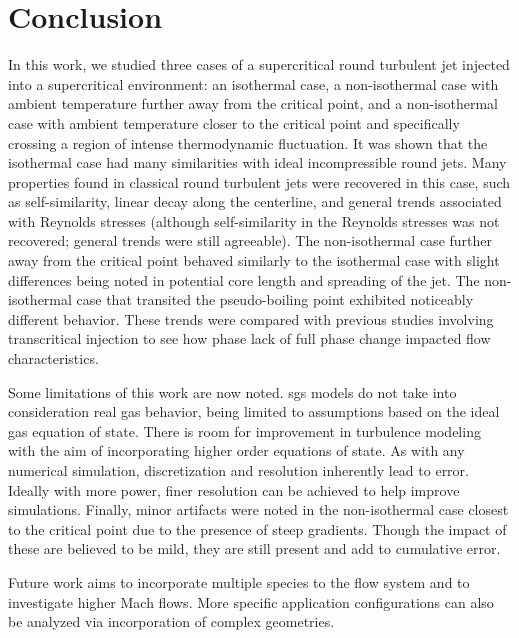 \chapter{Conclusion}

In this work, we studied three cases of a supercritical round turbulent jet injected into a supercritical environment: an isothermal case, a non-isothermal case with ambient temperature further away from the critical point, and a non-isothermal case with ambient temperature closer to the critical point and specifically crossing a region of intense thermodynamic fluctuation. It was shown that the isothermal case had many similarities with ideal incompressible round jets. Many properties found in classical round turbulent jets were recovered in this case, such as self-similarity, linear decay along the centerline, and general trends associated with Reynolds stresses (although self-similarity in the Reynolds stresses was not recovered; general trends were still agreeable). The non-isothermal case further away from the critical point behaved similarly to the isothermal case with slight differences being noted in potential core length and spreading of the jet. The non-isothermal case that transited the pseudo-boiling point exhibited noticeably different behavior. These trends were compared with previous studies involving transcritical injection to see how phase lack of full phase change impacted flow characteristics. 

Some limitations of this work are now noted. \gls{sgs} models do not take into consideration real gas behavior, being limited to assumptions based on the ideal gas equation of state. There is room for improvement in turbulence modeling with the aim of incorporating higher order equations of state. As with any numerical simulation, discretization and resolution inherently lead to error. Ideally with more power, finer resolution can be achieved to help improve simulations. Finally, minor artifacts were noted in the non-isothermal case closest to the critical point due to the presence of steep gradients. Though the impact of these are believed to be mild, they are still present and add to cumulative error. 

Future work aims to incorporate multiple species to the flow system and to investigate higher Mach flows. More specific application configurations can also be analyzed via incorporation of complex geometries. 


